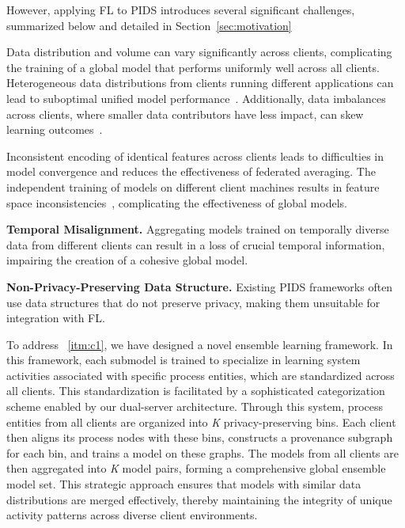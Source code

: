 However, applying FL to PIDS introduces several significant challenges, summarized below and detailed in Section~\ref{sec:motivation}

\begin{enumerate}[itemsep=0.1em, parsep=0em, topsep=0em]
   Data distribution and volume can vary significantly across clients, complicating the training of a global model that performs uniformly well across all clients. Heterogeneous data distributions from clients running different applications can lead to suboptimal unified model performance~\cite{qu2022rethinking}. Additionally, data imbalances across clients, where smaller data contributors have less impact, can skew learning outcomes~\cite{duan2020self}.

   Inconsistent encoding of identical features across clients leads to difficulties in model convergence and reduces the effectiveness of federated averaging. The independent training of \wordvec models on different client machines results in feature space inconsistencies~\cite{zhou2023fedfa}, complicating the effectiveness of global \gnnshort models.

   {\bf Temporal Misalignment.} Aggregating models trained on temporally diverse data from different clients can result in a loss of crucial temporal information, impairing the creation of a cohesive global model.
  
   {\bf Non-Privacy-Preserving Data Structure.} Existing PIDS frameworks often use data structures that do not preserve privacy, making them unsuitable for integration with FL.
\end{enumerate}



To address ~\ref{itm:c1}, we have designed a novel ensemble learning framework. In this framework, each submodel is trained to specialize in learning system activities associated with specific process entities, which are standardized across all clients. This standardization is facilitated by a sophisticated categorization scheme enabled by our dual-server architecture. Through this system, process entities from all clients are organized into \textit{K} privacy-preserving bins. Each client then aligns its process nodes with these bins, constructs a provenance subgraph for each bin, and trains a \gnnshort model on these graphs. The models from all clients are then aggregated into \textit{K} model pairs, forming a comprehensive global ensemble model set. This strategic approach ensures that models with similar data distributions are merged effectively, thereby maintaining the integrity of unique activity patterns across diverse client environments.

